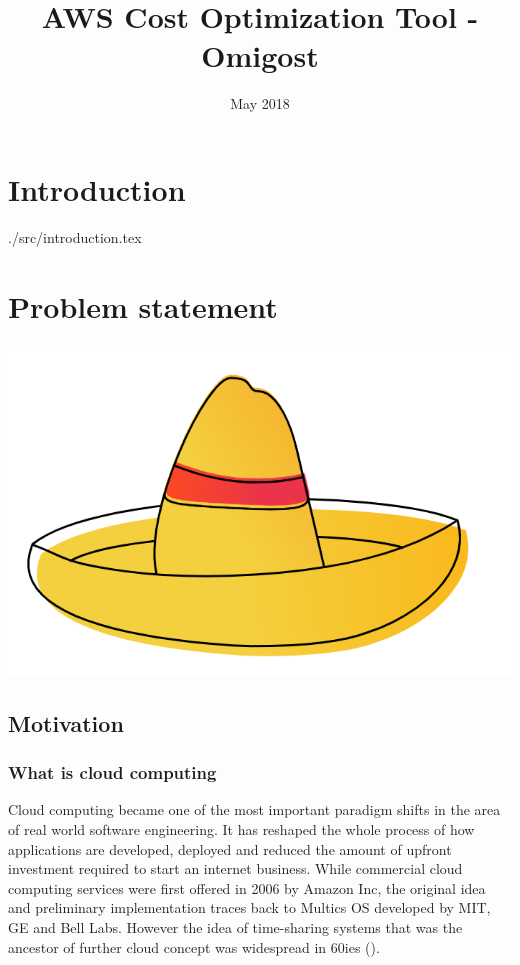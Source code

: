 \documentclass[licencjacka,en]{thesisclass}
\title{AWS Cost Optimization Tool - Omigost}
\date{May 2018}
\begin{document}
\maketitle

\begin{abstract}
  
\end{abstract}

\tableofcontents

\chapter{Introduction}
{./src/introduction.tex}

\chapter{Problem statement}

\includegraphics[width=\textwidth*\real{0.4}]{imgs/sombrerro.png}

\section{Motivation}

\subsection{What is cloud computing}

Cloud computing became one of the most important paradigm shifts in the area of real world software engineering.
It has reshaped the whole process of how applications are developed, deployed and reduced the amount of upfront
investment required to start an internet business. While commercial cloud computing services were first offered
in 2006 by Amazon Inc, the original idea and preliminary implementation traces back to Multics OS developed by MIT,
GE and Bell Labs. However the idea of time-sharing systems that was the ancestor of further cloud
concept was widespread in 60ies (\cite{bib-cloud-markus}).
\end{document}

